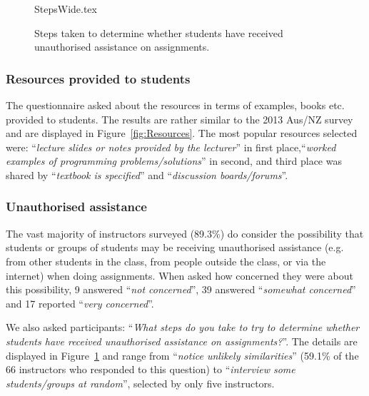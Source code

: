\documentclass[a4paper,11pt]{article}
\begin{document}
\begin{figure}[th]
\begin{center}
{StepsWide.tex}
\end{center}
\caption{Steps taken to determine whether students have received unauthorised assistance on assignments.\label{fig:Plagiarise}}
\end{figure}

\subsubsection{Resources provided to students}

The questionnaire asked about the resources in terms of examples,
books etc. provided to students. The results are rather similar to the
2013 Aus/NZ survey~\cite[Figure 14]{mason+cooper:2014} and are displayed in Figure~\ref{fig:Resources}. The most popular resources selected were: ``{\emph{lecture slides or notes provided by the lecturer}}'' in first place,``{\emph{worked examples of programming problems/solutions}}'' in second, and third place was shared by ``{\emph{textbook is specified}}'' and ``{\emph{discussion boards/forums}}''.

\subsubsection{Unauthorised assistance}
The vast majority of instructors surveyed (89.3\%) do consider the possibility that students or groups of students may be receiving unauthorised assistance (e.g. from other students in the class, from people outside the class, or via the internet) when doing assignments. When asked how concerned they were about this possibility, 9 answered ``{\emph{not concerned}}'', 39 answered ``{\emph{somewhat concerned}}'' and 17 reported ``{\emph{very concerned}}''. 

We also asked participants: ``{\emph{What steps do you take to try to
determine whether students have received unauthorised assistance on
assignments?}}''. The details are displayed in Figure~\ref{fig:Plagiarise} and range from
``{\emph{notice unlikely similarities}}'' (59.1\% of the 66
instructors who responded to this question) to ``{\emph{interview some
students/groups at random}}'', selected by only five instructors.



\end{document}
